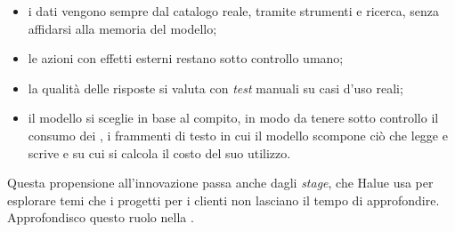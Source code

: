\begin{itemize}
	\item i dati vengono sempre dal catalogo reale, tramite strumenti e ricerca, senza affidarsi alla
	memoria del modello;
	\item le azioni con effetti esterni restano sotto controllo umano;
	\item la qualità delle risposte si valuta con \emph{test} manuali su casi d’uso reali;
	\item il modello si sceglie in base al compito, in modo da tenere sotto controllo il consumo dei
	, i frammenti di testo in cui il modello scompone ciò che legge e
	scrive e su cui si calcola il costo del suo utilizzo.
\end{itemize}

Questa propensione all’innovazione passa anche dagli \emph{stage}, che Halue usa per esplorare temi
che i progetti per i clienti non lasciano il tempo di approfondire. Approfondisco questo ruolo nella
.

